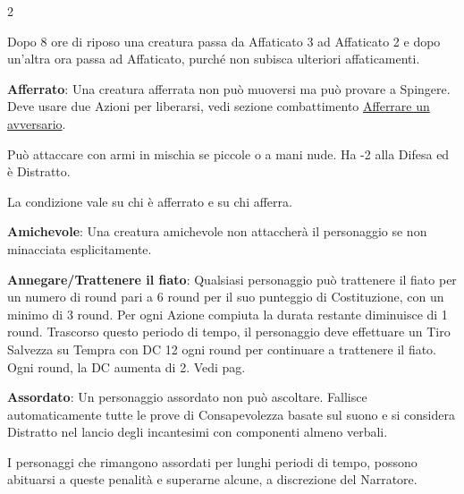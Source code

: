 \begin{multicols}{2}
%
%
%

\medskip

Dopo 8 ore di riposo una creatura passa da Affaticato 3 ad Affaticato 2 e dopo un'altra ora passa ad Affaticato, purché non subisca ulteriori affaticamenti.

\medskip

\textbf{Afferrato}: Una creatura afferrata non può muoversi ma può provare a Spingere. Deve usare due Azioni per liberarsi, vedi sezione combattimento \hyperlink{afferrareunavversario}{Afferrare un avversario}.

Può attaccare con armi in mischia se piccole o a mani nude. Ha -2 alla Difesa ed è Distratto.

La condizione vale su chi è afferrato e su chi afferra.

\textbf{Amichevole}: Una creatura amichevole non attaccherà il personaggio se non minacciata esplicitamente.

\textbf{Annegare/Trattenere il fiato}:  Qualsiasi personaggio può trattenere il fiato per un numero di round pari a 6 round per il suo punteggio di Costituzione, con un minimo di 3 round. Per ogni Azione compiuta la durata restante diminuisce di 1 round. Trascorso questo periodo di tempo, il personaggio deve effettuare un Tiro Salvezza su Tempra con DC 12 ogni round per continuare a trattenere il fiato. Ogni round, la DC aumenta di 2. Vedi pag. \pageref{trattenereilfiato}

\textbf{Assordato}: Un personaggio assordato non può ascoltare. Fallisce automaticamente tutte le prove di Consapevolezza basate sul suono e si considera Distratto nel lancio degli incantesimi con componenti almeno verbali.

I personaggi che rimangono assordati per lunghi periodi di tempo, possono abituarsi a queste penalità e superarne alcune, a discrezione del Narratore.


\end{multicols}
